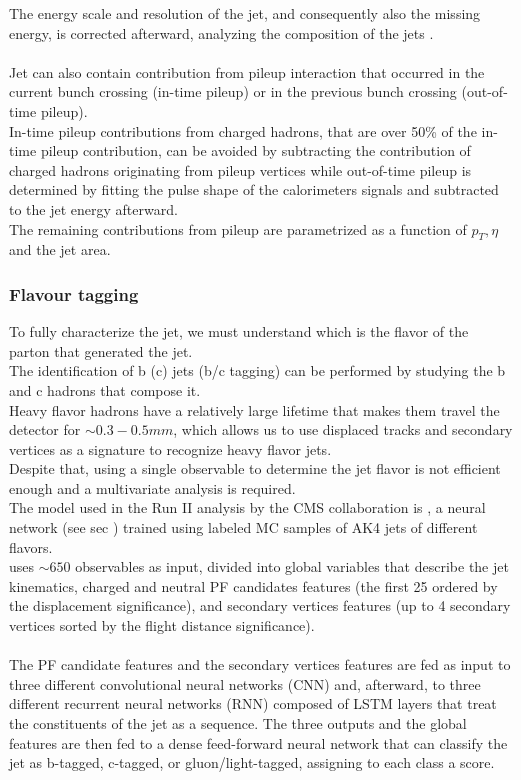 The energy scale and resolution of the jet, and consequently also the missing energy, is corrected afterward, analyzing the composition of the jets  \cite{Khachatryan2017JetTeV}.\\
\\
Jet can also contain contribution from pileup interaction that occurred in the current bunch crossing (in-time pileup) or in the previous bunch crossing (out-of-time pileup).\\
In-time pileup contributions from charged hadrons, that are over 50\% of the in-time pileup contribution, can be avoided by subtracting the contribution of charged hadrons originating from pileup vertices while out-of-time pileup is determined by fitting the pulse shape of the calorimeters signals and subtracted to the jet energy afterward.\\
The remaining contributions from pileup are parametrized as a function of $p_T, \eta$ and the jet area.

\subsubsection*{Flavour tagging}
To fully characterize the jet, we must understand which is the flavor of the parton that generated the jet.\\
The identification of b (c) jets (b/c tagging) can be performed by studying the b and c hadrons that compose it.\\
Heavy flavor hadrons have a relatively large lifetime that makes them travel the detector for $\sim 0.3-0.5mm$, which allows us to use displaced tracks and secondary vertices as a signature to recognize heavy flavor jets.\\
Despite that, using a single observable to determine the jet flavor is not efficient enough and a multivariate analysis is required.\\
The model used in the Run II analysis by the CMS collaboration is \DeepJet \cite{Bols2020JetDeepJet}, a neural network (see sec \ADDREF) trained using labeled MC samples of AK4 jets of different flavors.\\
\DeepJet uses $\sim 650$ observables as input, divided into global variables that describe the jet kinematics, charged and neutral PF candidates features (the first 25 ordered by the displacement significance), and secondary vertices features (up to 4 secondary vertices sorted by the flight distance significance).\\
\\
The PF candidate features and the secondary vertices features are fed as input to three different convolutional neural networks (CNN) \cite{OShea2015AnNetworks} and, afterward, to three different recurrent neural networks (RNN) composed of LSTM layers \cite{Sherstinsky2018FundamentalsNetwork} that treat the constituents of the jet as a sequence. The three outputs and the global features are then fed to a dense feed-forward neural network that can classify the jet as b-tagged, c-tagged, or gluon/light-tagged, assigning to each class a score.


